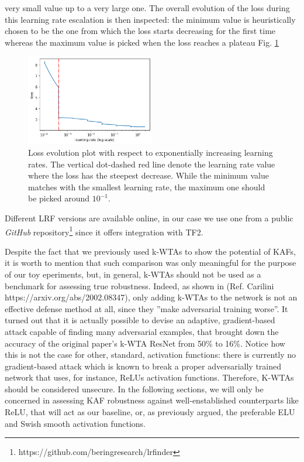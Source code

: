 \documentclass[LaM,binding=0.6cm]{./packages/sapthesis/sapthesis}
\begin{document}
very small value up to a very large one. The overall evolution of the loss 
during this learning rate escalation is then inspected: the minimum value is 
heuristically chosen to be the one from which the loss starts decreasing for the first time 
whereas the maximum value is picked when the loss reaches a plateau Fig. \ref{fig:lrf}
\begin{figure}[h!]
    \centering
    \includegraphics[width=0.50\textwidth]{lrf}
    \caption{Loss evolution plot with respect to exponentially increasing learning rates. The 
    vertical dot-dashed red line denote the learning rate value where the loss has the steepest decrease.
    While the minimum value matches with the smallest learning rate, the maximum one should be picked around
    $10^{-1}$.}
    \label{fig:lrf}
\end{figure}
Different LRF versions are available online, in our case we use one from a public \textit{GitHub} repository\footnote{https://github.com/beringresearch/lrfinder}
since it offers integration with TF2.

Despite the fact that we previously used k-WTAs to show the potential of KAFs, it is worth to 
mention that such comparison was only meaningful for the purpose of our toy eperiments, but, in general, 
k-WTAs should not be used as a benchmark for assessing true robustness.
Indeed, as shown in (Ref. Carilini https://arxiv.org/abs/2002.08347), only adding k-WTAs to the network 
is not an effective defense method at all, since they ''make adversarial training worse''.
It turned out that it is actually possible to devise an adaptive, gradient-based attack capable 
of finding many adversarial examples, that brought down the accuracy of the original paper's k-WTA ResNet from 50\% to 16\%. 
Notice how this is not the case for other, standard, activation 
functions: there is currently no gradient-based attack which is known to break a proper adversarially trained network that uses, for instance,
ReLUs activation functions. Therefore, K-WTAs should be considered unsecure. In the following 
sections, we will only be concerned in assessing KAF robustness against well-enstablished counterparts 
like ReLU, that will act as our baseline, or, as previously argued, the preferable ELU and 
Swish smooth activation functions.
\end{document}
